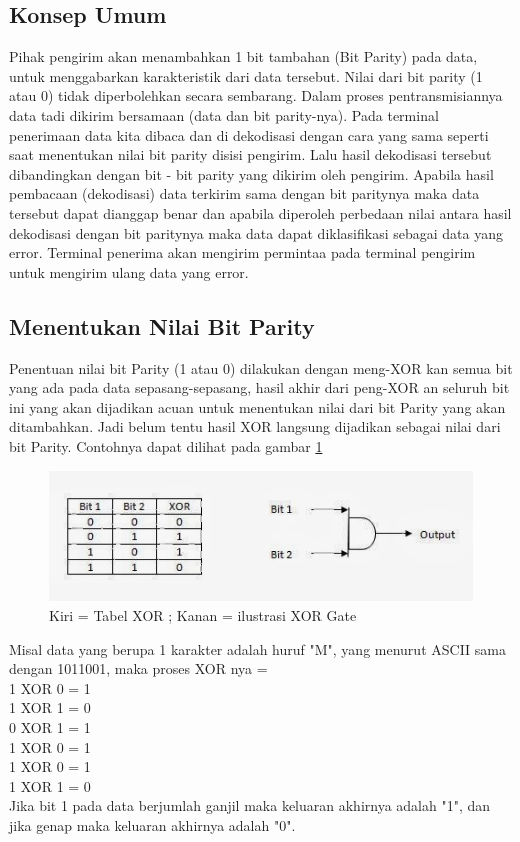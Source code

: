 \subsection{Konsep Umum}
Pihak pengirim akan menambahkan 1 bit tambahan (Bit Parity) pada data, untuk menggabarkan karakteristik dari data tersebut. Nilai dari bit parity (1 atau 0) tidak diperbolehkan secara sembarang. Dalam proses pentransmisiannya data tadi dikirim bersamaan (data dan bit parity-nya). Pada terminal penerimaan data kita dibaca dan di dekodisasi dengan cara yang sama seperti saat menentukan nilai bit parity disisi pengirim. Lalu hasil dekodisasi tersebut dibandingkan dengan bit - bit parity yang dikirim oleh pengirim. Apabila hasil pembacaan (dekodisasi) data terkirim sama dengan bit paritynya maka data tersebut dapat dianggap benar dan apabila diperoleh perbedaan nilai antara hasil dekodisasi dengan bit paritynya maka data dapat diklasifikasi sebagai data yang error. Terminal penerima akan mengirim permintaa pada terminal pengirim untuk mengirim ulang data yang error.
 
\subsection{Menentukan Nilai Bit Parity}
Penentuan nilai bit Parity (1 atau 0) dilakukan dengan meng-XOR kan semua bit yang ada pada data sepasang-sepasang, hasil akhir dari peng-XOR an seluruh bit ini yang akan dijadikan acuan untuk menentukan nilai dari bit Parity yang akan ditambahkan. Jadi belum tentu hasil XOR langsung dijadikan sebagai nilai dari bit Parity. Contohnya dapat dilihat pada gambar \ref{ilustrasixorgate}

\begin{figure}[ht]
\centerline{\includegraphics[width=1\textwidth]{figures/ilustrasixorgate.jpg}}
\caption{Kiri = Tabel XOR ; Kanan = ilustrasi XOR Gate}
\label{ilustrasixorgate}
\end{figure}

Misal data yang berupa 1 karakter adalah huruf  "M", yang menurut ASCII sama dengan 1011001, maka proses XOR nya =\\
1 XOR 0 = 1\\
1 XOR 1 = 0\\
0 XOR 1 = 1\\
1 XOR 0 = 1\\
1 XOR 0 = 1\\
1 XOR 1 = 0\\
Jika bit 1 pada data berjumlah ganjil maka keluaran akhirnya adalah "1", dan jika genap maka keluaran akhirnya adalah "0". 

